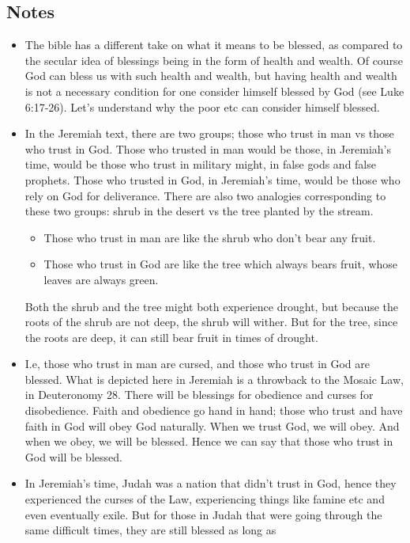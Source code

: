 \subsection*{Notes}
\begin{itemize}
  \item{The bible has a different take on what it means to be blessed, as
  compared to the secular idea of blessings being in the form of health and
  wealth.  Of course God can bless us with such health and wealth, but having
  health and wealth is not a necessary condition for one consider himself
  blessed by God (see Luke 6:17-26).  Let's understand why the poor etc can
  consider himself blessed.}
  \item{In the Jeremiah text, there are two groups; those who trust in man vs
  those who trust in God.  Those who trusted in man would be those, in
  Jeremiah's time, would be those who trust in military might, in false gods
  and false prophets.  Those who trusted in God, in Jeremiah's time, would be
  those who rely on God for deliverance.  There are also two analogies
  corresponding to these two groups: shrub in the desert vs the tree planted
  by the stream.
  \begin{itemize}
    \item{Those who trust in man are like the shrub who don't bear any fruit.}
    \item{Those who trust in God are like the tree which always bears fruit,
    whose leaves are always green.}
  \end{itemize}} Both the shrub and the tree might both experience drought,
  but because the roots of the shrub are not deep, the shrub will wither.
  But for the tree, since the roots are deep, it can still bear fruit in
  times of drought.
  \item{I.e, those who trust in man are cursed, and those who trust in God
  are blessed.  What is depicted here in Jeremiah is a throwback to the
  Mosaic Law, in Deuteronomy 28.  There will be blessings for obedience and
  curses for disobedience.  Faith and obedience go hand in hand; those who
  trust and have faith in God will obey God naturally.  When we trust God, we
  will obey.  And when we obey, we will be blessed.  Hence we can say that
  those who trust in God will be blessed.}
  \item{In Jeremiah's time, Judah was a nation that didn't trust in God,
  hence they experienced the curses of the Law, experiencing things like
  famine etc and even eventually exile.  But for those in Judah that were
  going through the same difficult times, they are still blessed as long as
}
\end{itemize}

